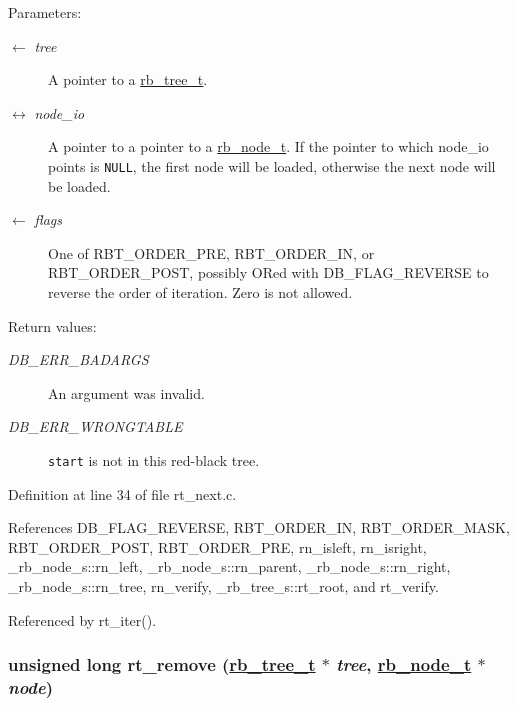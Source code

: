 \begin{Desc}
\item[Parameters:]
\begin{description}
\item[\mbox{$\leftarrow$} {\em tree}]A pointer to a \hyperlink{group__dbprim__rbtree_ga0}{rb\_\-tree\_\-t}. \item[\mbox{$\leftrightarrow$} {\em node\_\-io}]A pointer to a pointer to a \hyperlink{group__dbprim__rbtree_ga1}{rb\_\-node\_\-t}. If the pointer to which node\_\-io points is {\tt NULL}, the first node will be loaded, otherwise the next node will be loaded. \item[\mbox{$\leftarrow$} {\em flags}]One of RBT\_\-ORDER\_\-PRE, RBT\_\-ORDER\_\-IN, or RBT\_\-ORDER\_\-POST, possibly ORed with DB\_\-FLAG\_\-REVERSE to reverse the order of iteration. Zero is not allowed.\end{description}
\end{Desc}
\begin{Desc}
\item[Return values:]
\begin{description}
\item[{\em DB\_\-ERR\_\-BADARGS}]An argument was invalid. \item[{\em DB\_\-ERR\_\-WRONGTABLE}]{\tt start} is not in this red-black tree.\end{description}
\end{Desc}


Definition at line 34 of file rt\_\-next.c.

References DB\_\-FLAG\_\-REVERSE, RBT\_\-ORDER\_\-IN, RBT\_\-ORDER\_\-MASK, RBT\_\-ORDER\_\-POST, RBT\_\-ORDER\_\-PRE, rn\_\-isleft, rn\_\-isright, \_\-rb\_\-node\_\-s::rn\_\-left, \_\-rb\_\-node\_\-s::rn\_\-parent, \_\-rb\_\-node\_\-s::rn\_\-right, \_\-rb\_\-node\_\-s::rn\_\-tree, rn\_\-verify, \_\-rb\_\-tree\_\-s::rt\_\-root, and rt\_\-verify.

Referenced by rt\_\-iter().\hypertarget{group__dbprim__rbtree_ga9}{
\subsubsection[rt\_\-remove]{\setlength{\rightskip}{0pt plus 5cm}unsigned long rt\_\-remove (\hyperlink{struct__rb__tree__s}{rb\_\-tree\_\-t} $\ast$ {\em tree}, \hyperlink{struct__rb__node__s}{rb\_\-node\_\-t} $\ast$ {\em node})}}
\label{group__dbprim__rbtree_ga9}


